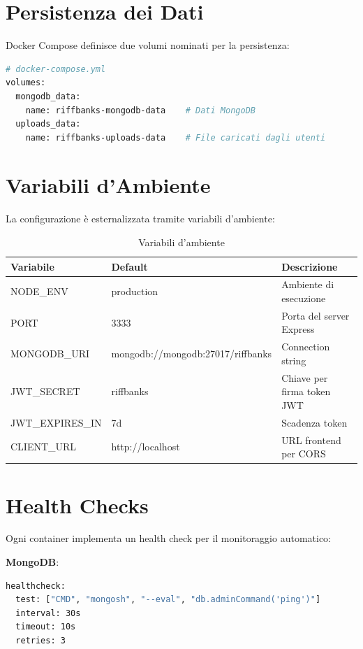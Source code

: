 \documentclass{report}
\begin{document}
\section{Persistenza dei Dati}

Docker Compose definisce due volumi nominati per la persistenza:

\begin{lstlisting}[language=bash, caption={Volumi Docker Compose}]
# docker-compose.yml
volumes:
  mongodb_data:
    name: riffbanks-mongodb-data    # Dati MongoDB
  uploads_data:
    name: riffbanks-uploads-data    # File caricati dagli utenti
\end{lstlisting}

\section{Variabili d'Ambiente}

La configurazione è esternalizzata tramite variabili d'ambiente:

\begin{table}[H]
\centering
\begin{tabular}{lll}
\toprule
\textbf{Variabile} & \textbf{Default} & \textbf{Descrizione} \\
\midrule
NODE\_ENV & production & Ambiente di esecuzione \\
PORT & 3333 & Porta del server Express \\
MONGODB\_URI & mongodb://mongodb:27017/riffbanks & Connection string \\
JWT\_SECRET & riffbanks & Chiave per firma token JWT \\
JWT\_EXPIRES\_IN & 7d & Scadenza token \\
CLIENT\_URL & http://localhost & URL frontend per CORS \\
\bottomrule
\end{tabular}
\caption{Variabili d'ambiente}
\end{table}

\section{Health Checks}

Ogni container implementa un health check per il monitoraggio automatico:

\textbf{MongoDB}:
\begin{lstlisting}[language=bash, caption={Health check MongoDB}]
healthcheck:
  test: ["CMD", "mongosh", "--eval", "db.adminCommand('ping')"]
  interval: 30s
  timeout: 10s
  retries: 3
\end{lstlisting}
\end{document}
